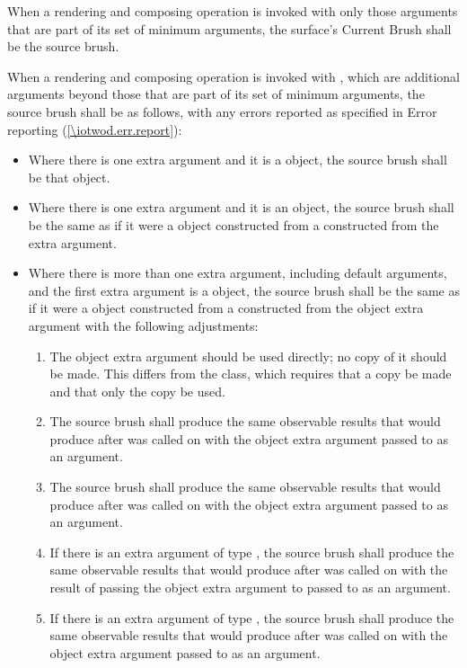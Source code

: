 \pnum
When a rendering and composing operation is invoked with only those arguments that are part of its set of minimum arguments, the surface's Current Brush shall be the source brush.

\pnum
When a rendering and composing operation is invoked with , which are additional arguments beyond those that are part of its set of minimum arguments, the source brush shall be as follows, with any errors reported as specified in Error reporting (\ref{\iotwod.err.report}):
\begin{itemize}
	\item Where there is one extra argument and it is a  object, the source brush shall be that  object.
	\item Where there is one extra argument and it is an  object, the source brush shall be the same as if it were a  object constructed from a  constructed from the extra argument.
	\item Where there is more than one extra argument, including default arguments, and the first extra argument is a  object, the source brush shall be the same as if it were a  object  constructed from a  constructed from the  object extra argument with the following adjustments:
	\begin{enumerate}
		\item The  object extra argument should be used directly; no copy of it should be made. This differs from the  class, which requires that a copy be made and that only the copy be used.
		\item The source brush shall produce the same observable results that  would produce after  was called on  with the  object extra argument passed to  as an argument.
		\item The source brush shall produce the same observable results that  would produce after  was called on  with the  object extra argument passed to  as an argument.
		\item If there is an extra argument of type , the source brush shall produce the same observable results that  would produce after  was called on  with the result of passing the  object extra argument to  passed to  as an argument.
		\item If there is an extra argument of type , the source brush shall produce the same observable results that  would produce after  was called on  with the  object extra argument passed to  as an argument.
	\end{enumerate}
\end{itemize}

